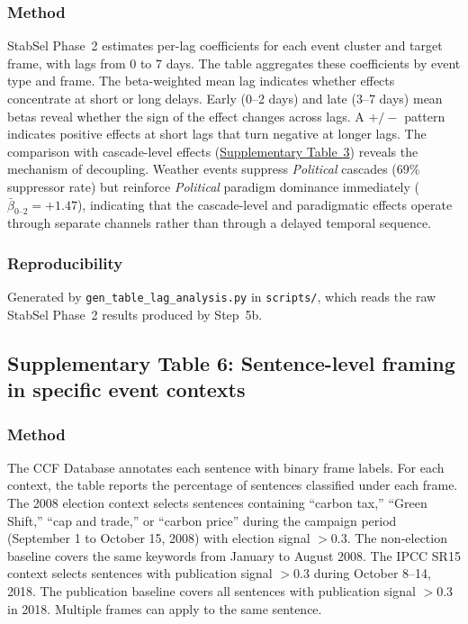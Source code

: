 \subsubsection*{Method}
StabSel Phase~2 estimates per-lag coefficients for each event cluster and target frame, with lags from 0 to 7 days. The table aggregates these coefficients by event type and frame. The beta-weighted mean lag indicates whether effects concentrate at short or long delays. Early (0--2 days) and late (3--7 days) mean betas reveal whether the sign of the effect changes across lags. A $+/-$ pattern indicates positive effects at short lags that turn negative at longer lags. The comparison with cascade-level effects (\hyperref[tab:si_event_frame]{Supplementary Table~3}) reveals the mechanism of decoupling. Weather events suppress \emph{Political} cascades (69\% suppressor rate) but reinforce \emph{Political} paradigm dominance immediately ($\bar{\beta}_{0\text{--}2} = +1.47$), indicating that the cascade-level and paradigmatic effects operate through separate channels rather than through a delayed temporal sequence.

\subsubsection*{Reproducibility}
Generated by \texttt{gen\_table\_lag\_analysis.py} in \texttt{scripts/},
which reads the raw StabSel Phase~2 results produced by Step~5b.


\newpage
\subsection*{Supplementary Table 6: Sentence-level framing in specific event contexts}



\subsubsection*{Method}
The CCF Database annotates each sentence with binary frame labels. For each context, the table reports the percentage of sentences classified under each frame. The 2008 election context selects sentences containing ``carbon tax,'' ``Green Shift,'' ``cap and trade,'' or ``carbon price'' during the campaign period (September 1 to October 15, 2008) with election signal $> 0.3$. The non-election baseline covers the same keywords from January to August 2008. The IPCC SR15 context selects sentences with publication signal $> 0.3$ during October 8--14, 2018. The publication baseline covers all sentences with publication signal $> 0.3$ in 2018. Multiple frames can apply to the same sentence.

